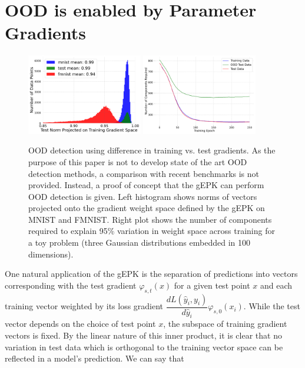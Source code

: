 \section{OOD is enabled by Parameter Gradients}
\label{sec:ood}
\begin{figure}[h]
\begin{center}
\includegraphics[width=0.45\textwidth]{c4a_figures/grad_alignment_hist.pdf}
\includegraphics[width=0.45\textwidth]{c4a_figures/ood_noise.pdf}
\end{center}
\caption{OOD detection using difference in training vs. test gradients. As the purpose of this paper is not to develop state of the art OOD detection methods, a comparison with recent benchmarks is not provided. Instead, a proof of concept that the gEPK can perform OOD detection is given. Left histogram shows norms of vectors projected onto the gradient weight space defined by the gEPK on MNIST and FMNIST. Right plot shows the number of components required to explain 95\% variation in weight space across training for a toy problem (three Gaussian distributions embedded in 100 dimensions). }
\label{fig:ood}
\end{figure}
One natural application of the gEPK is the separation of predictions into vectors corresponding with the test gradient $\varphi_{s,t}(x)$ for a given test point $x$ and each training vector  weighted by its loss gradient $\dfrac{dL(\hat y_i, y_i)}{d\hat y_i} \varphi_{s, 0}(x_i)$. While the test vector depends on the choice of test point $x$, the subspace of training gradient vectors is fixed. By the linear nature of this inner product, it is clear that no variation in test data which is orthogonal to the training vector space can be reflected in a model's prediction. We can say that 
